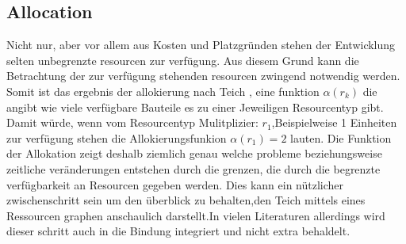 \documentclass[conference]{IEEEtran}
\begin{document}
\subsection{Allocation}






Nicht nur, aber vor allem aus Kosten und Platzgründen stehen der Entwicklung selten unbegrenzte resourcen zur verfügung. Aus diesem Grund kann die Betrachtung der zur verfügung stehenden resourcen zwingend notwendig werden. Somit ist das ergebnis der allokierung nach Teich \cite{1}    
, eine funktion $ \alpha(r_k)$ die angibt wie viele verfügbare Bauteile es zu einer Jeweiligen Resourcentyp gibt.\\
Damit würde, wenn vom Resourcentyp Mulitplizier: $r_1$,Beispielweise 1 Einheiten zur verfügung stehen die Allokierungsfunkion $\alpha(r_1) = 2$ lauten. Die Funktion der Allokation zeigt deshalb ziemlich genau welche probleme beziehungsweise zeitliche veränderungen entstehen durch die grenzen, die durch die begrenzte verfügbarkeit an Resourcen gegeben werden. Dies kann ein nützlicher zwischenschritt sein um den überblick zu behalten,den Teich mittels eines Ressourcen graphen anschaulich darstellt.In vielen Literaturen allerdings wird dieser schritt auch in die Bindung integriert und nicht extra behaldelt.
\end{document}
